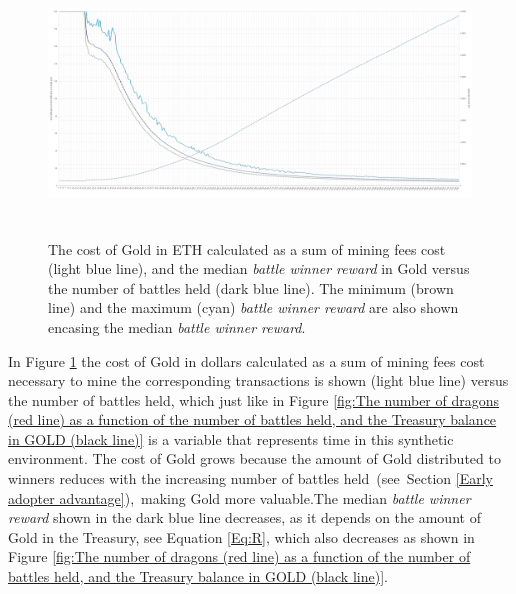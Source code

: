\documentclass[12pt]{article}
\begin{document}
{\begin{figure}[H]
	\begin{Center}
		\includegraphics[width=6.27in,height=2.76in]{./media/CS1image2.png}
		\caption{The cost of Gold in ETH calculated as a sum of mining fees cost (light blue line), and the median {\it battle winner reward} in Gold versus the number of battles held (dark blue line).  The minimum (brown line) and the maximum (cyan) {\it battle winner reward} are also shown encasing the median {\it battle winner reward}.}
		\label{fig:The cost of Gold in dollars calculated as a sum of mining fees cost (light blue line), and the median battle reward in Gold versus the number of battles held (dark blue line).}
	\end{Center}
\end{figure}




In Figure \ref{fig:The cost of Gold in dollars calculated as a sum of mining fees cost (light blue line), and the median battle reward in Gold versus the number of battles held (dark blue line).} the cost of Gold in dollars calculated as a sum of mining fees cost necessary to mine the corresponding transactions is shown (light blue line) versus the number of battles held, which just like in Figure \ref{fig:The number of dragons (red line) as a function of the number of battles held, and the Treasury balance in GOLD (black line)} is a variable that represents time in this synthetic environment. The cost of Gold grows because the amount of Gold distributed to winners reduces with the increasing number of battles held\ (see\ Section   \ref{Early adopter advantage}),\ making Gold more valuable.The median {\it battle winner reward} shown in the dark blue line decreases, as it depends on the amount of Gold in the Treasury, see Equation  \ref{Eq:R}, which also decreases as shown in Figure \ref{fig:The number of dragons (red line) as a function of the number of battles held, and the Treasury balance in GOLD (black line)}.\par

}
\end{document}
